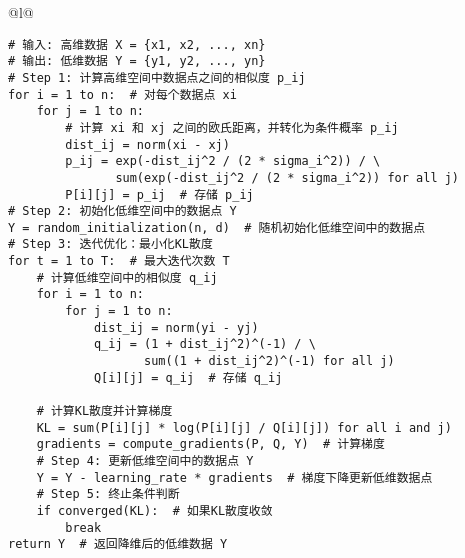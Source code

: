 \documentclass[master]{thesis-uestc}
\begin{document}
\begin{table}[h]
    \caption{t-SNE算法伪代码}
    \begin{tabular}{@{}l@{}} %
    \toprule
     \\ %
    \midrule
    \begin{lstlisting}[basicstyle=\ttfamily,frame=none]
# 输入: 高维数据 X = {x1, x2, ..., xn}
# 输出: 低维数据 Y = {y1, y2, ..., yn}
# Step 1: 计算高维空间中数据点之间的相似度 p_ij
for i = 1 to n:  # 对每个数据点 xi
    for j = 1 to n:
        # 计算 xi 和 xj 之间的欧氏距离，并转化为条件概率 p_ij
        dist_ij = norm(xi - xj)
        p_ij = exp(-dist_ij^2 / (2 * sigma_i^2)) / \
               sum(exp(-dist_ij^2 / (2 * sigma_i^2)) for all j)
        P[i][j] = p_ij  # 存储 p_ij    
# Step 2: 初始化低维空间中的数据点 Y
Y = random_initialization(n, d)  # 随机初始化低维空间中的数据点
# Step 3: 迭代优化：最小化KL散度
for t = 1 to T:  # 最大迭代次数 T
    # 计算低维空间中的相似度 q_ij
    for i = 1 to n:
        for j = 1 to n:
            dist_ij = norm(yi - yj)
            q_ij = (1 + dist_ij^2)^(-1) / \
                   sum((1 + dist_ij^2)^(-1) for all j)
            Q[i][j] = q_ij  # 存储 q_ij

    # 计算KL散度并计算梯度
    KL = sum(P[i][j] * log(P[i][j] / Q[i][j]) for all i and j)
    gradients = compute_gradients(P, Q, Y)  # 计算梯度    
    # Step 4: 更新低维空间中的数据点 Y
    Y = Y - learning_rate * gradients  # 梯度下降更新低维数据点
    # Step 5: 终止条件判断
    if converged(KL):  # 如果KL散度收敛
        break
return Y  # 返回降维后的低维数据 Y
    \end{lstlisting} \\
    \bottomrule
    \end{tabular}
    \label{table:tsne_code}
\end{table}
\FloatBarrier  %
\end{document}
